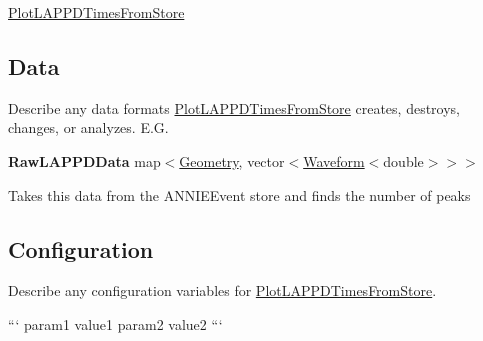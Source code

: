 \hyperlink{classPlotLAPPDTimesFromStore}{Plot\-L\-A\-P\-P\-D\-Times\-From\-Store}

\subsection*{Data}

Describe any data formats \hyperlink{classPlotLAPPDTimesFromStore}{Plot\-L\-A\-P\-P\-D\-Times\-From\-Store} creates, destroys, changes, or analyzes. E.\-G.

{\bfseries Raw\-L\-A\-P\-P\-D\-Data} {\ttfamily map$<$\hyperlink{classGeometry}{Geometry}, vector$<$\hyperlink{classWaveform}{Waveform}$<$double$>$$>$$>$}
\begin{DoxyItemize}
\item Takes this data from the {\ttfamily A\-N\-N\-I\-E\-Event} store and finds the number of peaks
\end{DoxyItemize}

\subsection*{Configuration}

Describe any configuration variables for \hyperlink{classPlotLAPPDTimesFromStore}{Plot\-L\-A\-P\-P\-D\-Times\-From\-Store}.

``` param1 value1 param2 value2 ``` 